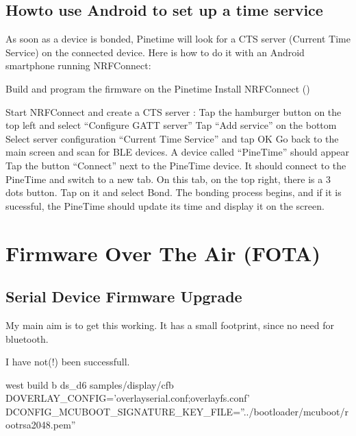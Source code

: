 \documentclass[letterpaper,10pt,english]{sphinxmanual}
\begin{document}
\section{Howto use Android to set up a time service}
\label{\detokenize{current-time:howto-use-android-to-set-up-a-time-service}}
As soon as a device is bonded, Pinetime will look for a CTS server (Current Time Service) on the connected device.
Here is how to do it with an Android smartphone running NRFConnect:

Build and program the firmware on the Pinetime Install NRFConnect ()

Start NRFConnect and create a CTS server : Tap the hamburger button on the top left and select “Configure GATT server” Tap “Add service” on the bottom Select server configuration “Current Time Service” and tap OK Go back to the main screen and scan for BLE devices. A device called “PineTime” should appear Tap the button “Connect” next to the PineTime device. It should connect to the PineTime and switch to a new tab. On this tab, on the top right, there is a 3 dots button. Tap on it and select Bond. The bonding process begins, and if it is sucessful, the PineTime should update its time and display it on the screen.


\chapter{Firmware Over The Air (FOTA)}
\label{\detokenize{fota/fota:firmware-over-the-air-fota}}\label{\detokenize{fota/fota:fota}}\label{\detokenize{fota/fota::doc}}

\section{Serial Device Firmware Upgrade}
\label{\detokenize{fota/mcuboot:serial-device-firmware-upgrade}}\label{\detokenize{fota/mcuboot:mcuboot}}\label{\detokenize{fota/mcuboot::doc}}
My main aim is to get this working.
It has a small footprint, since no need for bluetooth.

I have not(!) been successfull.

west build \sphinxhyphen{}b ds\_d6 samples/display/cfb \textendash{} \sphinxhyphen{}DOVERLAY\_CONFIG=’overlay\sphinxhyphen{}serial.conf;overlay\sphinxhyphen{}fs.conf’  \sphinxhyphen{}DCONFIG\_MCUBOOT\_SIGNATURE\_KEY\_FILE=”../bootloader/mcuboot/root\sphinxhyphen{}rsa\sphinxhyphen{}2048.pem”
\end{document}
